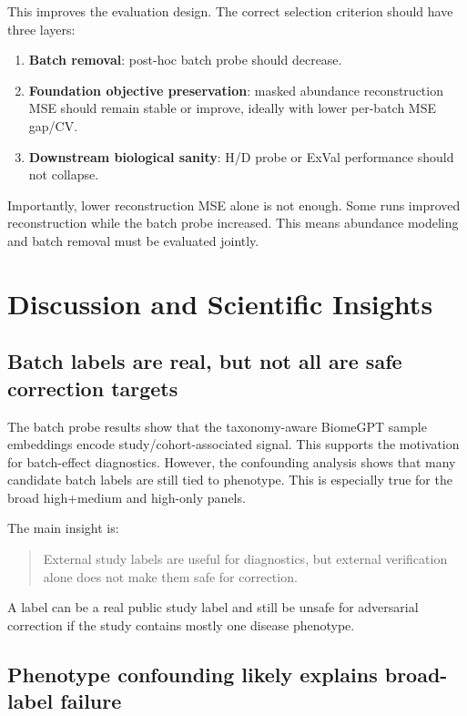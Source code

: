 \documentclass[11pt]{article}
\begin{document}
This improves the evaluation design. The correct selection criterion should have three
layers:

\begin{enumerate}
  \item \textbf{Batch removal}: post-hoc batch probe should decrease.
  \item \textbf{Foundation objective preservation}: masked abundance reconstruction MSE
  should remain stable or improve, ideally with lower per-batch MSE gap/CV.
  \item \textbf{Downstream biological sanity}: H/D probe or ExVal performance should not
  collapse.
\end{enumerate}

Importantly, lower reconstruction MSE alone is not enough. Some runs improved
reconstruction while the batch probe increased. This means abundance modeling and batch
removal must be evaluated jointly.

\section{Discussion and Scientific Insights}

\subsection{Batch labels are real, but not all are safe correction targets}

The batch probe results show that the taxonomy-aware BiomeGPT sample embeddings encode
study/cohort-associated signal. This supports the motivation for batch-effect diagnostics.
However, the confounding analysis shows that many candidate batch labels are still tied to
phenotype. This is especially true for the broad high+medium and high-only panels.

The main insight is:

\begin{quote}
External study labels are useful for diagnostics, but external verification alone does not
make them safe for correction.
\end{quote}

A label can be a real public study label and still be unsafe for adversarial correction if
the study contains mostly one disease phenotype.

\subsection{Phenotype confounding likely explains broad-label failure}
\end{document}
